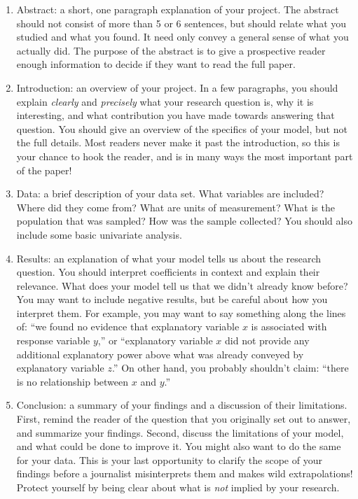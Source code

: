 \documentclass[]{article}
\begin{document}
\begin{enumerate}
\def\labelenumi{\arabic{enumi}.}
\item
  Abstract: a short, one paragraph explanation of your project. The
  abstract should not consist of more than 5 or 6 sentences, but should
  relate what you studied and what you found. It need only convey a
  general sense of what you actually did. The purpose of the abstract is
  to give a prospective reader enough information to decide if they want
  to read the full paper.
\item
  Introduction: an overview of your project. In a few paragraphs, you
  should explain \emph{clearly} and \emph{precisely} what your research
  question is, why it is interesting, and what contribution you have
  made towards answering that question. You should give an overview of
  the specifics of your model, but not the full details. Most readers
  never make it past the introduction, so this is your chance to hook
  the reader, and is in many ways the most important part of the paper!
\item
  Data: a brief description of your data set. What variables are
  included? Where did they come from? What are units of measurement?
  What is the population that was sampled? How was the sample collected?
  You should also include some basic univariate analysis.
\item
  Results: an explanation of what your model tells us about the research
  question. You should interpret coefficients in context and explain
  their relevance. What does your model tell us that we didn't already
  know before? You may want to include negative results, but be careful
  about how you interpret them. For example, you may want to say
  something along the lines of: ``we found no evidence that explanatory
  variable \(x\) is associated with response variable \(y\),'' or
  ``explanatory variable \(x\) did not provide any additional
  explanatory power above what was already conveyed by explanatory
  variable \(z\).'' On other hand, you probably shouldn't claim: ``there
  is no relationship between \(x\) and \(y\).''
\item
  Conclusion: a summary of your findings and a discussion of their
  limitations. First, remind the reader of the question that you
  originally set out to answer, and summarize your findings. Second,
  discuss the limitations of your model, and what could be done to
  improve it. You might also want to do the same for your data. This is
  your last opportunity to clarify the scope of your findings before a
  journalist misinterprets them and makes wild extrapolations! Protect
  yourself by being clear about what is \emph{not} implied by your
  research.
\end{enumerate}
\end{document}
